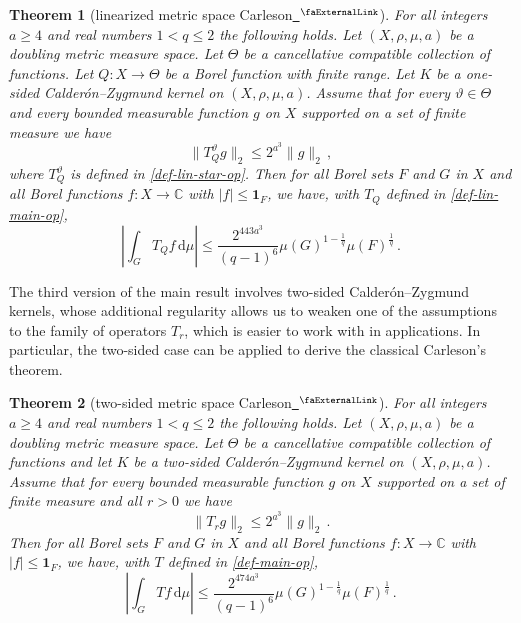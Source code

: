 \documentclass[12pt]{amsart}
\newcommand*{\complex}{\mathbb{C}} %
\newcommand{\extlink}{~\ensuremath{{}^\text{\faExternalLink}}}
\theoremstyle{definition}
\theoremstyle{plain}
\newtheorem{theorem}{Theorem}[subsection]
\newcommand{\tQ}{{Q}}
\newcommand{\mfa}{{\vartheta}}
\newcommand{\Mf}{{\Theta}}
\begin{document}
\begin{theorem}[linearized metric space Carleson\href{https://github.com/fpvandoorn/carleson/blob/020d6e5c71d731952eb0379d222eea4049103ca0/Carleson/MetricCarleson/Linearized.lean\#L109}{\extlink}]
\label{linearized-metric-Carleson}
    For all integers $a \ge 4$ and real numbers $1<q\le 2$ the following holds.
    Let $(X,\rho,\mu,a)$ be a doubling metric measure space. Let $\Mf$ be a
    cancellative compatible collection of functions.
    Let $\tQ:X\to \Mf$ be a Borel function with finite range.
    Let $K$ be a one-sided Calder\'on--Zygmund kernel on $(X,\rho,\mu,a)$. Assume that for every $\mfa\in \Mf$ and every bounded measurable function $g$ on $X$ supported on a set of finite measure we have
    \begin{equation}\label{linnontanbound}
        \|T_{\tQ}^\mfa g\|_{2} \leq 2^{a^3} \|g\|_2\,,
    \end{equation}
    where $T_{\tQ}^\mfa$ is defined in \eqref{def-lin-star-op}.
    Then for all Borel sets $F$ and $G$ in $X$ and all Borel functions $f\colon X\to \complex$ with
    $|f|\le \mathbf{1}_F$, we have, with $T_\tQ$ defined in \eqref{def-lin-main-op},
    \begin{equation}
        \left|\int_{G} T_\tQ f \, \mathrm{d}\mu\right| \le \frac{2^{443a^3}}{(q-1)^6} \mu(G)^{1-\frac{1}{q}} \mu(F)^{\frac{1}{q}}\, .
    \end{equation}
\end{theorem}

The third version of the main result involves two-sided Calder\'on--Zygmund kernels, whose additional regularity allows us to weaken one of the assumptions to the family of operators $T_r$, which is easier to work with in applications.
In particular, the two-sided case can be applied to derive the classical Carleson's theorem.

\begin{theorem}[two-sided metric space Carleson\href{https://github.com/fpvandoorn/carleson/blob/020d6e5c71d731952eb0379d222eea4049103ca0/Carleson/TwoSidedCarleson/MainTheorem.lean\#L30}{\extlink}]
    \label{two-sided-metric-space-Carleson}
        For all  integers $a \ge  4$ and real numbers $1<q\le 2$ the following holds.
        Let $(X,\rho,\mu,a)$ be a doubling metric measure space. Let $\Mf$ be a
        cancellative compatible collection of functions and let $K$ be a two-sided Calder\'on--Zygmund kernel on $(X,\rho,\mu,a)$. Assume that for every bounded measurable function $g$ on $X$ supported on a set of finite measure and all $r>0$ we have
      \begin{equation}
            \|T_r g\|_{2} \leq 2^{a^3} \|g\|_2\,.
        \end{equation}
        Then for all Borel sets $F$ and $G$ in $X$ and
        all Borel functions $f\colon X\to \complex$ with
        $|f|\le \mathbf{1}_F$, we have, with $T$ defined in \eqref{def-main-op},
      \begin{equation}
            \left|\int_{G} T f \, \mathrm{d}\mu\right| \leq \frac{2^{474a^3}}{(q-1)^6} \mu(G)^{1-\frac{1}{q}} \mu(F)^{\frac{1}{q}}\, .
        \end{equation}
\end{theorem}
\end{document}
